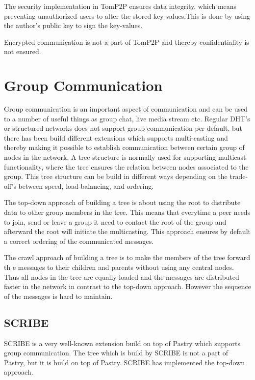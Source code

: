 The security implementation in TomP2P ensures data integrity, which means preventing unauthorized users to alter the stored key-values.This is done by using the author's public key to sign the key-values.

Encrypted communication is not a part of TomP2P and thereby confidentiality is not ensured.


\section{Group Communication}
Group communication is an important aspect of communication and can be used to a number of useful things as group chat, live media stream etc.
Regular DHT's or structured networks does not support group communication per default, but there has been build different extensions which supports multi-casting and thereby making it possible to establish communication between certain group of nodes in the network. 
A tree structure is normally used for supporting multicast functionality, where the tree ensures the relation between nodes associated to the group. This tree structure can be build in different ways depending on the trade-off's between speed, load-balancing, and ordering.

The top-down approach of building a tree is about using the root to distribute data to other group members in the tree. This means that everytime a peer needs to join, send or leave a group it need to contact the root of the group and afterward the root will initiate the multicasting. This approach ensures by default a correct ordering of the communicated messages. 

The crawl approach of building a tree is to make the members of the tree forward th e messages to their children and parents without using any central nodes. Thus all nodes in the tree are equally loaded and the messages are distributed faster in the network in contrast to the top-down approach. However the sequence of the messages is hard to maintain. 

\subsection{SCRIBE}
SCRIBE is a very well-known extension build on top of Pastry which supports group communication. 
The tree which is build by SCRIBE is not a part of Pastry, but it is build on top of Pastry. SCRIBE has implemented the top-down approach. 

